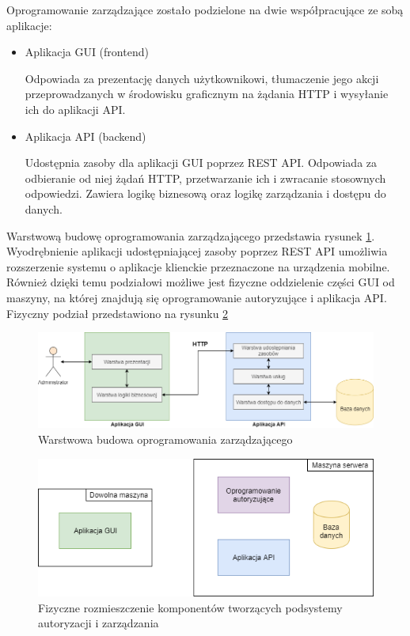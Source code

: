     	Oprogramowanie zarządzające zostało podzielone na dwie współpracujące ze sobą aplikacje:

    	\begin{itemize}
    		\item Aplikacja GUI (frontend)

    			Odpowiada za prezentację danych użytkownikowi, tłumaczenie jego akcji przeprowadzanych w środowisku graficznym na żądania HTTP i wysyłanie ich do aplikacji API.

    		\item Aplikacja API (backend)

    			Udostępnia zasoby dla aplikacji GUI poprzez REST API. Odpowiada za odbieranie od niej żądań HTTP, przetwarzanie ich i zwracanie stosownych odpowiedzi. Zawiera logikę biznesową oraz logikę zarządzania i dostępu do danych.
    	\end{itemize}

    	Warstwową budowę oprogramowania zarządzającego przedstawia rysunek \ref{fig:mngmt_subs_layers}. Wyodrębnienie aplikacji udostępniającej zasoby poprzez REST API umożliwia rozszerzenie systemu o aplikacje klienckie przeznaczone na urządzenia mobilne. Również dzięki temu podziałowi możliwe jest fizyczne oddzielenie części GUI od maszyny, na której znajdują się oprogramowanie autoryzujące i aplikacja API. Fizyczny podział przedstawiono na rysunku \ref{fig:fiz}

        \begin{figure}[]
            \centering
            \includegraphics[width=\textwidth]{chapters/images/mngmt_subsystem_layers.png}
            \caption{Warstwowa budowa oprogramowania zarządzającego}
            \label{fig:mngmt_subs_layers}
        \end{figure}

        \begin{figure}[]
            \centering
            \includegraphics[width=\textwidth]{chapters/images/fiz.png}
            \caption{Fizyczne rozmieszczenie komponentów tworzących podsystemy autoryzacji i zarządzania}
            \label{fig:fiz}
        \end{figure}

